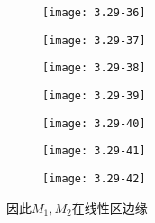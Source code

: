 		\begin{figure}[H] %
	\begin{minipage}{\linewidth}
		\texttt{[image: 3.29-36]}
	\end{minipage}
\end{figure}

		\begin{figure}[H] %
	\begin{minipage}{\linewidth}
		\texttt{[image: 3.29-37]}
	\end{minipage}
\end{figure}

		\begin{figure}[H] %
	\begin{minipage}{\linewidth}
		\texttt{[image: 3.29-38]}
	\end{minipage}
\end{figure}

		\begin{figure}[H] %
	\begin{minipage}{\linewidth}
		\texttt{[image: 3.29-39]}
	\end{minipage}
\end{figure}

		\begin{figure}[H] %
	\begin{minipage}{\linewidth}
		\texttt{[image: 3.29-40]}
	\end{minipage}
\end{figure}

		\begin{figure}[H] %
	\begin{minipage}{\linewidth}
		\texttt{[image: 3.29-41]}
	\end{minipage}
\end{figure}

		\begin{figure}[H] %
	\begin{minipage}{\linewidth}
		\texttt{[image: 3.29-42]}
	\end{minipage}
\end{figure}

因此$M_1,M_2$在线性区边缘





